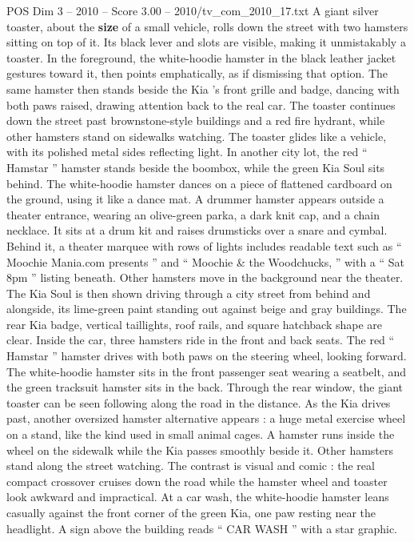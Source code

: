 \begin{textsample}{POS Dim 3 – 2010 – Score 3.00 – 2010/tv\_com\_2010\_17.txt}
A giant silver toaster, about the \textbf{size} of a small vehicle, rolls down the street with two hamsters sitting on top of it.
Its black lever and slots are visible, making it unmistakably a toaster.
In the foreground, the white-hoodie hamster in the black leather jacket gestures toward it, then points emphatically, as if dismissing that option.
The same hamster then stands beside the Kia ’s front grille and badge, dancing with both paws raised, drawing attention back to the real car.
The toaster continues down the street past brownstone-style buildings and a red fire hydrant, while other hamsters stand on sidewalks watching.
The toaster glides like a vehicle, with its polished metal sides reflecting light.
In another city lot, the red “ Hamstar ” hamster stands beside the boombox, while the green Kia Soul sits behind.
The white-hoodie hamster dances on a piece of flattened cardboard on the ground, using it like a dance mat.
A drummer hamster appears outside a theater entrance, wearing an olive-green parka, a dark knit cap, and a chain necklace.
It sits at a drum kit and raises drumsticks over a snare and cymbal.
Behind it, a theater marquee with rows of lights includes readable text such as “ Moochie Mania.com presents ” and “ Moochie \& the Woodchucks, ” with a “ Sat 8pm ” listing beneath.
Other hamsters move in the background near the theater.
The Kia Soul is then shown driving through a city street from behind and alongside, its lime-green paint standing out against beige and gray buildings.
The rear Kia badge, vertical taillights, roof rails, and square hatchback shape are clear.
Inside the car, three hamsters ride in the front and back seats.
The red “ Hamstar ” hamster drives with both paws on the steering wheel, looking forward.
The white-hoodie hamster sits in the front passenger seat wearing a seatbelt, and the green tracksuit hamster sits in the back.
Through the rear window, the giant toaster can be seen following along the road in the distance.
As the Kia drives past, another oversized hamster alternative appears : a huge metal exercise wheel on a stand, like the kind used in small animal cages.
A hamster runs inside the wheel on the sidewalk while the Kia passes smoothly beside it.
Other hamsters stand along the street watching.
The contrast is visual and comic : the real compact crossover cruises down the road while the hamster wheel and toaster look awkward and impractical.
At a car wash, the white-hoodie hamster leans casually against the front corner of the green Kia, one paw resting near the headlight.
A sign above the building reads “ CAR WASH ” with a star graphic.

\end{textsample}
